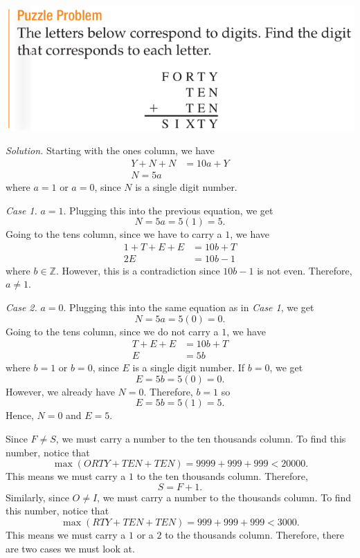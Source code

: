 \documentclass[12pt]{article}
\begin{document}
\begin{center}
\includegraphics[scale=0.6]{forty.png}
\end{center}

\noindent\textit{Solution.}
Starting with the ones column, we have
\begin{align*}
  Y+N+N&=10a+Y\\
  N=5a
\end{align*}
where $a=1$ or $a=0$, since $N$ is a single digit number.
\vspace{20px}

\noindent\textit{Case 1.} $a=1$. Plugging this into the previous equation, we get
\[N=5a=5(1)=5.\]
Going to the tens column, since we have to carry a $1$, we have
\begin{align*}
  1+T+E+E&=10b+T\\
  2E&=10b-1
\end{align*}
where $b\in\mathbb{Z}$. However, this is a contradiction since $10b-1$ is not even. Therefore, $a\neq 1$.
\vspace{20px}

\noindent\textit{Case 2.} $a=0$. Plugging this into the same equation as in \textit{Case 1}, we get
\[N=5a=5(0)=0.\]
Going to the tens column, since we do not carry a $1$, we have
\begin{align*}
  T+E+E&=10b+T\\
  E&=5b
\end{align*}
where $b=1$ or $b=0$, since $E$ is a single digit number. If $b=0$, we get
\[E=5b=5(0)=0.\]
However, we already have $N=0$. Therefore, $b=1$ so
\[E=5b=5(1)=5.\]
Hence, $\boxed{N=0}$ and $\boxed{E=5}$.
\newpage

\noindent Since $F\neq S$, we must carry a number to the ten thousands column. To find this number, notice that
\[\max(ORTY+TEN+TEN)=9999+999+999<20000.\]
This means we must carry a $1$ to the ten thousands column. Therefore,
\[S=F+1.\]
Similarly, since $O\neq I$, we must carry a number to the thousands column. To find this number, notice that
\[\max(RTY+TEN+TEN)=999+999+999<3000.\]
This means we must carry a $1$ or a $2$ to the thousands column. Therefore, there are two cases we must look at.
\vspace{20px}
\end{document}

